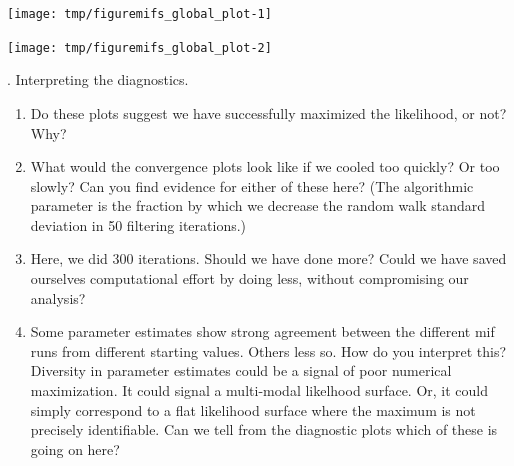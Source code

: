 \documentclass{beamer}\usepackage[]{graphicx}\usepackage[]{color}
\newenvironment{knitrout}{}{} %
\begin{document}
\begin{frame}[fragile]
\begin{knitrout}
{\centering \texttt{[image: tmp/figuremifs\_global\_plot-1]} 

}




{\centering \texttt{[image: tmp/figuremifs\_global\_plot-2]} 

}



\end{knitrout}

\end{frame}


\begin{frame}[fragile]

\myquestion. Interpreting the diagnostics.
\begin{enumerate}
\item Do these plots suggest we have successfully maximized the likelihood, or not? Why?

\item What would the convergence plots look like if we cooled too quickly? Or too slowly? Can you find evidence for either of these here? (The algorithmic parameter  is the fraction by which we decrease the random walk standard deviation in 50 filtering iterations.)

\item Here, we did 300  iterations. Should we have done more? Could we have saved ourselves computational effort by doing less, without compromising our analysis?

\item Some parameter estimates show strong agreement between the different mif runs from different starting values. Others less so. How do you interpret this? Diversity in parameter estimates could be a signal of poor numerical maximization. It could signal a multi-modal likelhood surface. Or, it could simply correspond to a flat likelihood surface where the maximum is not precisely identifiable. Can we tell from the diagnostic plots which of these is going on here?

\end{enumerate}

\end{frame}
\end{document}
